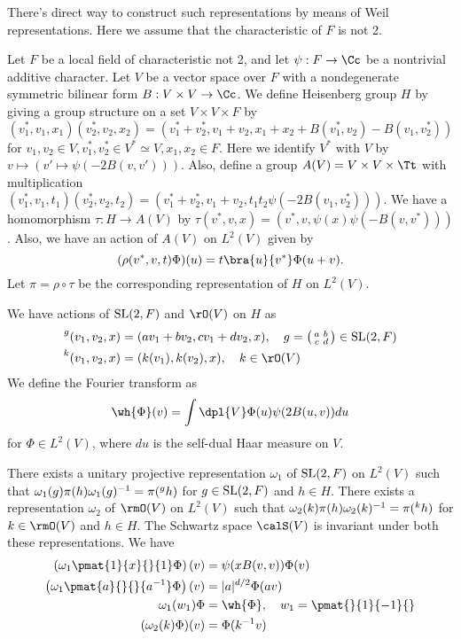 There's direct way to construct such representations by means of Weil representations. Here we assume that the characteristic of $F$ is not 2. 

\begin{definition}
Let $F$ be a local field of characteristic not 2, and let $\psi:F\to \Cc$ be a nontrivial additive character. Let $V$ be a vector space over $F$ with a nondegenerate symmetric bilinear form $B:V\times V\to \Cc$. 
We define Heisenberg group $H$ by giving a group structure on a set $V\times V\times F$ by 
$$
(v_{1}^{*}, v_{1}, x_{1}) (v_{2}^{*}, v_{2}, x_{2}) = (v_{1}^{*} + v_{2}^{*}, v_{1} + v_{2}, x_{1} + x_{2} + B(v_{1}^{*}, v_{2}) - B(v_{1}, v_{2}^{*}))
$$
for $v_1, v_2\in V, v_1^{*}, v_2^{*}\in V^{*} \simeq V, x_1, x_2\in F$. 
Here we identify $V^{*}$ with $V$ by $v\mapsto (v'\mapsto \psi(-2B(v, v')))$. 
Also, define a group $A(V) = V\times V\times \Tt$ with multiplication $(v_1^{*}, v_1, t_1)(v_2^{*}, v_2, t_2) = (v_1^{*} + v_2^{*}, v_1 + v_2, t_1 t_2 \psi(-2B(v_1, v_2^{*})))$. 
We have a homomorphism $\tau:H\to A(V)$ by $\tau(v^{*}, v, x) = (v^{*}, v, \psi(x)\psi(-B(v, v^{*})))$. 
Also, we have an action of $A(V)$ on $L^{2}(V)$ given by 
$$
(\rho(v^{*}, v, t)\Phi)(u) = t\bra{u}{v^{*}} \Phi(u+v).
$$
Let $\pi= \rho\circ \tau$ be the corresponding representation of $H$ on $L^2(V)$. 

We have actions of $\mathrm{SL}(2, F)$ and $\rO(V)$ on $H$ as 
\begin{align*}
\pre{g}{(v_1, v_2, x)} &= (av_1 + bv_2, cv_1 + dv_2, x), \quad g = \smat{a}{b}{c}{d}\in \SL(2, F) \\
\pre{k}{(v_1, v_2, x)} &= (k(v_1), k(v_2), x), \quad k\in \rO(V)
\end{align*}
We define the Fourier transform as 
$$
\wh{\Phi}(v) = \int\dpl{V} \Phi(u) \psi(2B(u, v))du
$$
for $\Phi\in L^{2}(V)$, where $du$ is the self-dual Haar measure on $V$.
\end{definition}
\begin{theorem}
There exists a unitary projective representation $\omega_1$ of $\mathrm{SL}(2, F)$ on $L^2(V)$ such that $\omega_1(g)\pi(h)\omega_1(g)^{-1} = \pi(\prescript{g}{}{}h)$ for $g\in\mathrm{SL}(2, F)$ and $h\in H$. 
There exists a representation $\omega_2$ of $\rmO(V)$ on $L^{2}(V)$ such that $\omega_2(k)\pi(h)\omega_2(k)^{-1} = \pi(\prescript{k}{}{}h)$ for $k\in \rmO(V)$ and $h\in H$. 
The Schwartz space $\calS(V)$ is invariant under both these representations. 
We have
\begin{align*}
\left(\omega_1\pmat{1}{x}{}{1}\Phi\right)(v) &=\psi(xB(v, v))\Phi(v)  \\
\left(\omega_1\pmat{a}{}{}{a^{-1}}\Phi\right)(v) &= |a|^{d/2}\Phi(av) \\
\omega_1(w_1)\Phi &= \wh{\Phi}, \quad w_1 = \pmat{}{1}{-1}{} \\
(\omega_2(k)\Phi)(v) &= \Phi(k^{-1}v)
\end{align*}
\end{theorem}
